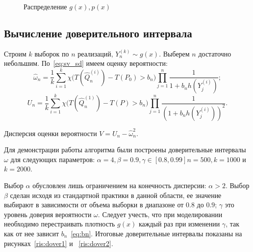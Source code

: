 \documentclass[12pt, specialist, subf, substylefile = spbu.rtx]{disser}
\begin{document}
\begin{figure}[h]
\caption{Распределение $g(x), p(x)$}
\label{ris:sectionAll}
\end{figure}


\subsection{Вычисление доверительного интервала}

Строим $k$ выборок по $n$ реализаций, $Y^{(k)}_n \sim g(x).$ Выберем $n$ достаточно небольшим. По~\eqref{eq:sv_sd} имеем оценку вероятности:
$$
\hat{\omega}_n=\frac{1}{k} \sum\limits_{i=1}^{k}
\chi \big(T(\hat{Q}^{(i)}_n)-T(P_0) > b_n\big)
\prod\limits_{j=1}^{n} \frac{1}{1+b_nh(Y_j^{(i)})};
$$
$$
U_n=\frac{1}{k} \sum\limits_{i=1}^{k}
\chi \big(T(\hat{Q}^{(1)}_n)-T(P) > b_n\big)
\prod\limits_{j=1}^{n} \frac{1}{(1+b_nh(Y_j^{(i)}))^2}.
$$

Дисперсия оценки вероятности $V=U_n-\hat\omega_n^2$.

Для демонстрации работы алгоритма были построены доверительные интервалы $\omega$ для следующих параметров: $\alpha=4, \beta=0.9, \gamma \in [0.8, 0.99] n=500, k=1000$ и $k=2000$. 

Выбор $\alpha$ обусловлен лишь ограничением на конечность дисперсии: $\alpha > 2.$ Выбор $\beta$ сделан исходя из стандартной практики в данной области, ее значение выбирают в зависимости от объема выборки в диапазоне от $0.8$ до $0.9$; $\gamma$ это уровень доверия вероятности $\omega$. Следует учесть, что при моделировании необходимо перестраивать плотность $g(x)$ каждый раз при изменении $\gamma$, так как от нее зависит $b_n$~\eqref{eq:bn}. Итоговые доверительные интервалы показаны на рисунках~\ref{ris:dover1} и ~\ref{ris:dover2}.
\end{document}
